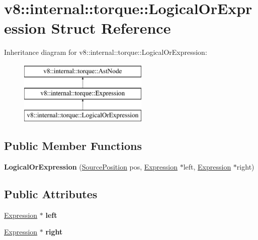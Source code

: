 \hypertarget{structv8_1_1internal_1_1torque_1_1LogicalOrExpression}{}\section{v8\+:\+:internal\+:\+:torque\+:\+:Logical\+Or\+Expression Struct Reference}
\label{structv8_1_1internal_1_1torque_1_1LogicalOrExpression}
Inheritance diagram for v8\+:\+:internal\+:\+:torque\+:\+:Logical\+Or\+Expression\+:\begin{figure}[H]
\begin{center}
\leavevmode
\includegraphics[height=3.000000cm]{structv8_1_1internal_1_1torque_1_1LogicalOrExpression}
\end{center}
\end{figure}
\subsection*{Public Member Functions}
\begin{DoxyCompactItemize}
\item 
\mbox{\label{structv8_1_1internal_1_1torque_1_1LogicalOrExpression_a014d6b4915edda17eb7a0dd6f16e42a6}} 
{\bfseries Logical\+Or\+Expression} (\mbox{\hyperlink{structv8_1_1internal_1_1torque_1_1SourcePosition}{Source\+Position}} pos, \mbox{\hyperlink{structv8_1_1internal_1_1torque_1_1Expression}{Expression}} $\ast$left, \mbox{\hyperlink{structv8_1_1internal_1_1torque_1_1Expression}{Expression}} $\ast$right)
\end{DoxyCompactItemize}
\subsection*{Public Attributes}
\begin{DoxyCompactItemize}
\item 
\mbox{\label{structv8_1_1internal_1_1torque_1_1LogicalOrExpression_aa121a156c85ba038599237b7e886f37f}} 
\mbox{\hyperlink{structv8_1_1internal_1_1torque_1_1Expression}{Expression}} $\ast$ {\bfseries left}
\item 
\mbox{\label{structv8_1_1internal_1_1torque_1_1LogicalOrExpression_aef5678995cdce163e317c71a1c04f94f}} 
\mbox{\hyperlink{structv8_1_1internal_1_1torque_1_1Expression}{Expression}} $\ast$ {\bfseries right}
\end{DoxyCompactItemize}
